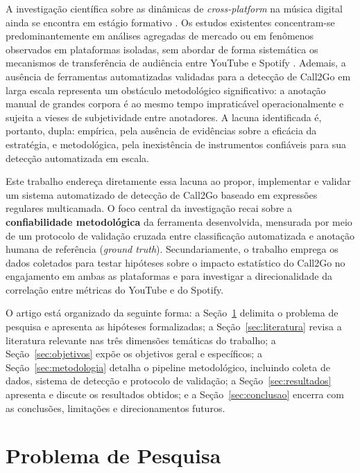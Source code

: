 \documentclass[12pt, a4paper]{article}
\begin{document}
A investigação científica sobre as dinâmicas de \textit{cross-platform} na música digital ainda se encontra em estágio formativo \cite{aguiar2018}. Os estudos existentes concentram-se predominantemente em análises agregadas de mercado ou em fenômenos observados em plataformas isoladas, sem abordar de forma sistemática os mecanismos de transferência de audiência entre YouTube e Spotify \cite{napoli2012}. Ademais, a ausência de ferramentas automatizadas validadas para a detecção de Call2Go em larga escala representa um obstáculo metodológico significativo: a anotação manual de grandes corpora é ao mesmo tempo impraticável operacionalmente e sujeita a vieses de subjetividade entre anotadores. A lacuna identificada é, portanto, dupla: empírica, pela ausência de evidências sobre a eficácia da estratégia, e metodológica, pela inexistência de instrumentos confiáveis para sua detecção automatizada em escala.

Este trabalho endereça diretamente essa lacuna ao propor, implementar e validar um sistema automatizado de detecção de Call2Go baseado em expressões regulares multicamada. O foco central da investigação recai sobre a \textbf{confiabilidade metodológica} da ferramenta desenvolvida, mensurada por meio de um protocolo de validação cruzada entre classificação automatizada e anotação humana de referência (\textit{ground truth}). Secundariamente, o trabalho emprega os dados coletados para testar hipóteses sobre o impacto estatístico do Call2Go no engajamento em ambas as plataformas e para investigar a direcionalidade da correlação entre métricas do YouTube e do Spotify.

O artigo está organizado da seguinte forma: a Seção~\ref{sec:problema} delimita o problema de pesquisa e apresenta as hipóteses formalizadas; a Seção~\ref{sec:literatura} revisa a literatura relevante nas três dimensões temáticas do trabalho; a Seção~\ref{sec:objetivos} expõe os objetivos geral e específicos; a Seção~\ref{sec:metodologia} detalha o pipeline metodológico, incluindo coleta de dados, sistema de detecção e protocolo de validação; a Seção~\ref{sec:resultados} apresenta e discute os resultados obtidos; e a Seção~\ref{sec:conclusao} encerra com as conclusões, limitações e direcionamentos futuros.

\section{Problema de Pesquisa}
\label{sec:problema}
\end{document}
